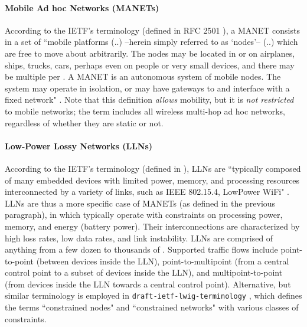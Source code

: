 
\paragraph{Mobile Ad hoc Networks (MANETs)} According to the IETF's terminology (defined in RFC 2501 \cite{rfc2501}), a MANET consists in a set of ``mobile platforms (..) --herein simply referred to as `nodes'-- (..) which are free to move about arbitrarily. The nodes may be located in or on airplanes, ships, trucks, cars, perhaps even on people or very small devices, and there may be multiple  per . A MANET is an autonomous system of mobile nodes. The system may operate in isolation, or may have gateways to and interface with a fixed network" \cite{rfc2501}. Note that this definition {\em allows}  mobility, but it is {\em not restricted} to mobile networks; the term includes all wireless multi-hop ad hoc networks, regardless of whether they are static or not. 

\paragraph{Low-Power Lossy Networks (LLNs)} According to the IETF's terminology (defined in \cite{draft_lln}), LLNs are ``typically composed of many embedded devices with limited power, memory, and processing resources interconnected by a variety of links, such as IEEE 802.15.4, LowPower WiFi" \cite{draft_lln}. LLNs are thus a more specific case of MANETs (as defined in the previous paragraph), in which  typically operate with constraints on processing power, memory, and energy (battery power). Their interconnections are characterized by high loss rates, low data rates, and link instability.  LLNs are comprised of anything from a few dozen to thousands of .  Supported traffic flows include point-to-point (between devices inside the LLN), point-to-multipoint (from a central control point to a subset of devices inside the LLN), and multipoint-to-point (from devices inside the LLN towards a central control point). Alternative, but similar terminology is employed in {\tt draft-ietf-lwig-terminology} \cite{bormann13}, which defines the terms ``constrained nodes" and ``constrained networks" with various classes of constraints. \\

